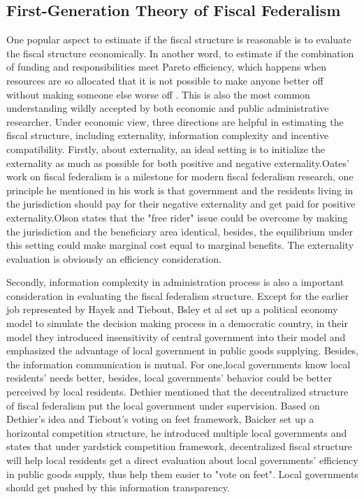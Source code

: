 \subsection{First-Generation Theory of Fiscal Federalism}


One popular aspect to estimate if the  fiscal structure is reasonable is to evaluate the fiscal structure economically. In another word, to estimate if the combination of funding and responsibilities meet Pareto efficiency, which happens when resources are so allocated that it is not possible to make anyone better off without making someone else worse off \cite{pareto2014manual}. This is also the most common understanding wildly accepted by both economic and public administrative researcher.  Under economic view, three directions are helpful in estimating the fiscal structure, including externality, information complexity and incentive compatibility. Firstly, about externality, an ideal setting is to initialize the externality as much as possible for both positive and negative externality.Oates' \cite{oates1972fiscal} work on fiscal federalism is a milestone for modern fiscal federalism research, one principle he mentioned in his work is that government and the residents living in the jurisdiction should pay for their negative externality and get paid for positive externality.Olson \cite{olson1993dictatorship} states that the "free rider" issue could be overcome by making the jurisdiction and the  beneficiary area identical, besides, the equilibrium under this setting could make marginal cost equal to marginal benefits. The externality evaluation is obviously an efficiency consideration. 

Secondly, information complexity in administration process is also a important consideration in evaluating the fiscal federalism structure. Except for the earlier job represented by Hayek and Tiebout, Bsley et al \cite{2003Centralized} set up a political economy model to simulate the decision making process in a democratic country, in their model they introduced insensitivity of central government into their model and emphasized the advantage of local government in public goods supplying. Besides, the information communication is mutual. For one,local governments know local residents' needs better, besides, local governments' behavior could be better perceived by local residents. Dethier \cite{martinez2003fiscal} mentioned that the decentralized structure of fiscal federalism put the local government under supervision. Based on Dethier's idea and Tiebout's voting on feet framework, Baicker \cite{baicker2005spillover} set up a horizontal competition structure, he introduced multiple local governments and states that under yardstick competition framework, decentralized fiscal structure will help local residents get a direct evaluation about  local governments' efficiency in public goods supply, thus help them easier to "vote on feet". Local governments should get pushed by this information transparency.

